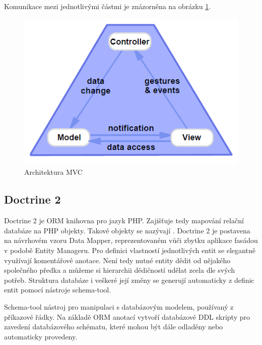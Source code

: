 \documentclass[thesis=B,czech]{FITthesis}[2012/06/26]
\begin{document}
	Komunikace mezi jednotlivými částmi je znázorněna na obrázku \ref{mvc_arch}.

	\begin{figure}
		\includegraphics[width=\textwidth]{mvc.png}
		\caption{Architektura MVC}\label{mvc_arch}
	\end{figure}
	
\subsection{Doctrine 2}
	Doctrine 2 je ORM knihovna pro jazyk PHP. Zajišťuje tedy mapování relační databáze na PHP objekty. Takové objekty se nazývají . Doctrine 2 je postavena na návrhovém vzoru Data Mapper, reprezentovaném vůči zbytku aplikace fasádou v podobě Entity Manageru. Pro definici vlastností jednotlivých entit se elegantně využívají komentářové anotace. Není tedy nutné entity dědit od nějakého společného předka a můžeme si hierarchii dědičností udělat zcela dle svých potřeb. Struktura databáze i veškeré její změny se generují automaticky z definic entit pomocí nástroje schema-tool. \cite{doctrine2} 
	
	Schema-tool nástroj pro manipulaci s databázovým modelem, používaný z příkazové řádky. Na základě ORM anotací vytvoří databázové DDL skripty pro zavedení databázového schématu, které mohou být dále odladěny nebo automaticky provedeny.
	
\end{document}
